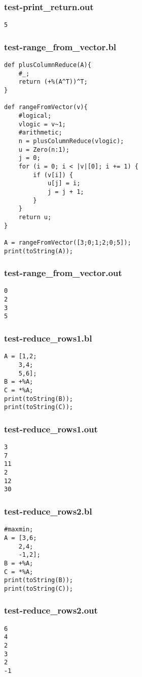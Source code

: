\subsubsection{test-print\_return.out}
\begin{lstlisting}
5
\end{lstlisting}
\subsubsection{test-range\_from\_vector.bl}
\begin{lstlisting}
def plusColumnReduce(A){
    #_;
    return (+%(A^T))^T;
}

def rangeFromVector(v){
    #logical;
    vlogic = v~1;
    #arithmetic;
    n = plusColumnReduce(vlogic);
    u = Zero(n:1);
    j = 0;
    for (i = 0; i < |v|[0]; i += 1) {
        if (v[i]) {
            u[j] = i;
            j = j + 1;
        }
    }
    return u;
}

A = rangeFromVector([3;0;1;2;0;5]);
print(toString(A));
\end{lstlisting}
\subsubsection{test-range\_from\_vector.out}
\begin{lstlisting}
0
2
3
5
\end{lstlisting}
\subsubsection{test-reduce\_rows1.bl}
\begin{lstlisting}
A = [1,2;
    3,4;
    5,6];
B = +%A;
C = *%A;
print(toString(B));
print(toString(C));\end{lstlisting}
\subsubsection{test-reduce\_rows1.out}
\begin{lstlisting}
3
7
11
2
12
30\end{lstlisting}
\subsubsection{test-reduce\_rows2.bl}
\begin{lstlisting}
#maxmin;
A = [3,6;
    2,4;
    -1,2];
B = +%A;
C = *%A;
print(toString(B));
print(toString(C));
\end{lstlisting}
\subsubsection{test-reduce\_rows2.out}
\begin{lstlisting}
6
4
2
3
2
-1
\end{lstlisting}
